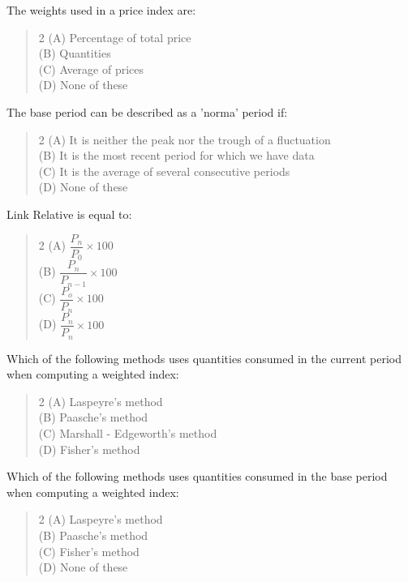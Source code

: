 \documentclass[11pt,a4paper]{article}
\begin{document}
\begin{mcqlist}
\item The weights used in a price index are:
\begin{quote}\begin{multicols}{2}
\noindent (A) Percentage of total price \\
(B) Quantities \\
(C) Average of prices \\
(D) None of these
\end{multicols}\end{quote}

\item The base period can be described as a 'norma' period if:
\begin{quote}\begin{multicols}{2}
\noindent (A) It is neither the peak nor the trough of a fluctuation \\
(B) It is the most recent period for which we have data \\
(C) It is the average of several consecutive periods \\
(D) None of these
\end{multicols}\end{quote}

\item Link Relative is equal to:
\begin{quote}\begin{multicols}{2}
\noindent (A) $\dfrac{P_n}{P_0}\times 100$ \\
(B) $\dfrac{P_n}{P_{n-1}}\times 100$ \\
(C) $\dfrac{P_o}{P_n}\times 100$ \\
(D) $\dfrac{P_n}{P_n}\times 100$
\end{multicols}\end{quote}

\item Which of the following methods uses quantities consumed in the current period when computing a weighted index:
\begin{quote}\begin{multicols}{2}
\noindent (A) Laspeyre's method \\
(B) Paasche's method \\
(C) Marshall - Edgeworth's method \\
(D) Fisher's method
\end{multicols}\end{quote}

\item Which of the following methods uses quantities consumed in the base period when computing a weighted index:
\begin{quote}\begin{multicols}{2}
\noindent (A) Laspeyre's method \\
(B) Paasche's method \\
(C) Fisher's method \\
(D) None of these
\end{multicols}\end{quote}


\end{mcqlist}
\end{document}
